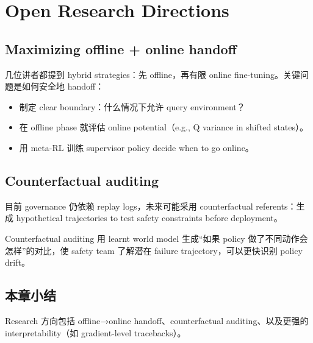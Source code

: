 \section{Open Research Directions}

\subsection{Maximizing offline + online handoff}

几位讲者都提到 hybrid strategies：先 offline，再有限 online fine-tuning。关键问题是如何安全地 handoff：

\begin{itemize}
    \item 制定 clear boundary：什么情况下允许 query environment？
    \item 在 offline phase 就评估 online potential（e.g., Q variance in shifted states）。
    \item 用 meta-RL 训练 supervisor policy decide when to go online。
\end{itemize}

\subsection{Counterfactual auditing}

目前 governance 仍依赖 replay logs，未来可能采用 counterfactual referents：生成 hypothetical trajectories to test safety constraints before deployment。

\begin{knowledgebox}{Counterfactual auditing}
用 learnt world model 生成“如果 policy 做了不同动作会怎样”的对比，使 safety team 了解潜在 failure trajectory，可以更快识别 policy drift。
\end{knowledgebox}

\subsection{本章小结}

Research 方向包括 offline→online handoff、counterfactual auditing、以及更强的 interpretability（如 gradient-level tracebacks）。

